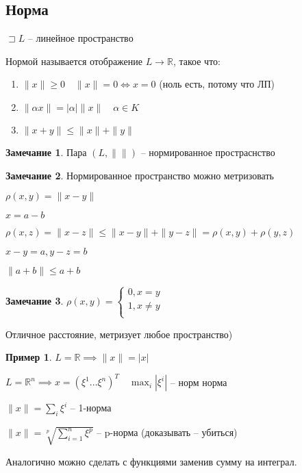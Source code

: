 \documentclass{book}
\newcommand\R{\ensuremath{\mathbb{R}}}
\theoremstyle{definition}
\newtheorem*{note}{Замечание}
\newtheorem*{example}{Пример}
\begin{document}
\subsection{Норма}
\begin{definition}
    $\sqsupset L$ -- линейное пространство

    Нормой называется отображение $L \to \R$, такое что:
    \begin{enumerate}
        \item $\|x\| \geqslant 0\quad \|x\| = 0 \iff  x = 0$ (ноль есть, потому что ЛП)
        \item $\|\alpha x\| = |\alpha|\|x\|\quad \alpha \in K$
        \item $\|x + y\| \leqslant \|x\| + \|y\|$
    \end{enumerate}
\end{definition}
\begin{note}
    Пара $(L, \|\|)$ -- нормированное простраснство
\end{note}
\begin{note}
    Нормированное пространство можно метризовать

    $\rho(x, y) = \|x-y\|$

     $x = a - b$

     $\rho(x, z) = \|x-z\|\leqslant \|x-y\| + \|y-z\| = \rho(x,y) + \rho(y,z)$

     $x - y = a, y - z = b$

      $\|a + b\| \leqslant a + b$
\end{note}

\begin{note}
    $\rho(x,y) = \begin{cases}
        0, x = y\\
        1, x \neq y\\
    \end{cases}$ 

    Отличное расстояние, метризует любое пространство)
\end{note}

\begin{example}
    $L = \R\implies \|x\| = |x|$

    $L = \R^n \implies x = \left( \xi^1 \ldots \xi^n \right) ^T\quad \max_i|\xi^i|$ -- норм норма

    $\|x\| = \sum_{i}^{} \xi^i$ -- 1-норма

    $\|x\| = \sqrt[p]{   \sum_{i=1}^{n} \xi^p}$ -- p-норма (доказывать -- убиться)

    Аналогично можно сделать с функциями заменив сумму на интеграл.
\end{example}
\end{document}
